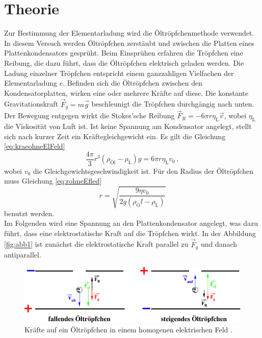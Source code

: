 \section{Theorie}
\label{sec:Theorie}

Zur Bestimmung der Elementarladung wird die Öltröpfchenmethode verwendet. 
In diesem Versuch werden Öltröpfchen zerstäubt und zwischen die Platten eines Plattenkondensators gesprüht.
Beim Einsprühen erfahren die Tröpfchen eine Reibung, die dazu führt, dass die Öltröpfchen elektrisch geladen werden.
Die Ladung einzelner Tröpfchen entspricht einem ganzzahligen Vielfachen der Elementarladung $e$.
Befinden sich die Öltröpfchen zwischen den Kondensatorplatten, wirken eine oder mehrere Kräfte auf diese. 
Die konstante Gravitationskraft $\vec{F}_g = m \vec{g}$ beschleunigt die Tröpfchen durchgängig nach unten.
Der Bewegung entgegen wirkt die Stokes'sche Reibung $\vec{F}_R = -6 \pi r \eta_\text{L} \vec{v}$, wobei $\eta_\text{L}$ die Viskosität von Luft ist.
Ist keine Spannung am Kondensator angelegt, stellt sich nach kurzer Zeit ein Kräftegleichgewicht ein.
Es gilt die Gleichung \eqref{eq:kraeohneElFeld}
\begin{equation}
    \frac{4 \pi}{3} r^3(\rho_\text{Öl} - \rho_\text{L})g = 6 \pi r \eta_\text{L} v_0 \, ,
    \label{eq:kraeohneElFeld}
\end{equation}
wobei $v_0$ die Gleichgewichtsgeschwindigkeit ist. 
Für den Radius der Öltröpfchen muss Gleichung \eqref{eq:rohneEfled}
\begin{equation}
    r = \sqrt{\frac{9 \eta v_0}{2 g (\rho_Öl - \rho_\text{L})}}
    \label{eq:rohneEfled}
\end{equation}
benutzt werden.\\

Im Folgenden wird eine Spannung an den Plattenkondensator angelegt, was dazu führt, dass eine elektrostatische Kraft auf die Tröpfchen wirkt.
In der Abbildung \autoref{fig:abb1} ist zunächst die elektrostatische Kraft parallel zu $\vec{F}_g$ und danach antiparallel.


\begin{figure}[H]
    \centering
    \includegraphics{figures/Abb1.pdf}
    \caption{Kräfte auf ein Öltröpfchen in einem homogenen elektrischen Feld \cite{ap12}.}
    \label{fig:abb1}
\end{figure}


